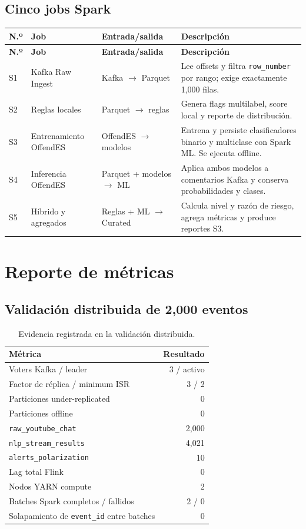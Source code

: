 \documentclass[11pt,a4paper,openany]{report}
\newcommand{\topic}[1]{\texttt{#1}}
\begin{document}
\section{Cinco jobs Spark}

\begin{longtable}{p{0.7cm}p{2.8cm}p{3.5cm}p{6.9cm}}
\toprule
\textbf{N.º} & \textbf{Job} & \textbf{Entrada/salida} & \textbf{Descripción}\\
\midrule
\endfirsthead
\toprule
\textbf{N.º} & \textbf{Job} & \textbf{Entrada/salida} & \textbf{Descripción}\\
\midrule
\endhead
S1 & Kafka Raw Ingest & Kafka $\rightarrow$ Parquet & Lee offsets y filtra \topic{row\_number} por rango; exige exactamente 1,000 filas.\\
S2 & Reglas locales & Parquet $\rightarrow$ reglas & Genera flags multilabel, score local y reporte de distribución.\\
S3 & Entrenamiento OffendES & OffendES $\rightarrow$ modelos & Entrena y persiste clasificadores binario y multiclase con Spark ML. Se ejecuta offline.\\
S4 & Inferencia OffendES & Parquet + modelos $\rightarrow$ ML & Aplica ambos modelos a comentarios Kafka y conserva probabilidades y clases.\\
S5 & Híbrido y agregados & Reglas + ML $\rightarrow$ Curated & Calcula nivel y razón de riesgo, agrega métricas y produce reportes S3.\\
\bottomrule
\end{longtable}
\normalsize

\chapter{Reporte de métricas}

\section{Validación distribuida de 2,000 eventos}

\begin{table}[htbp]
\centering
\begin{tabular}{lr}
\toprule
\textbf{Métrica} & \textbf{Resultado}\\
\midrule
Voters Kafka / leader & 3 / activo\\
Factor de réplica / minimum ISR & 3 / 2\\
Particiones under-replicated & 0\\
Particiones offline & 0\\
\topic{raw\_youtube\_chat} & 2,000\\
\topic{nlp\_stream\_results} & 4,021\\
\topic{alerts\_polarization} & 10\\
Lag total Flink & 0\\
Nodos YARN compute & 2\\
Batches Spark completos / fallidos & 2 / 0\\
Solapamiento de \topic{event\_id} entre batches & 0\\
\bottomrule
\end{tabular}
\caption{Evidencia registrada en la validación distribuida.}
\end{table}
\end{document}
